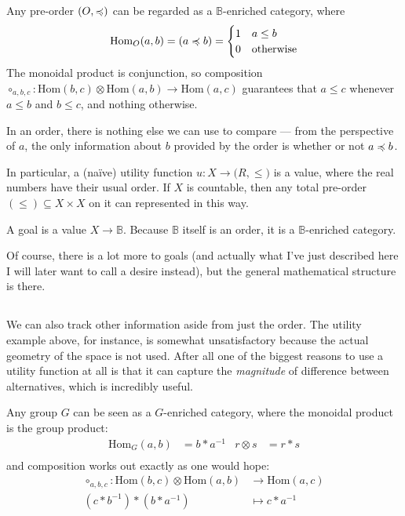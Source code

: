 \documentclass{article}
\begin{document}
	\begin{example}
		Any pre-order $(O, \preccurlyeq)$ can be regarded as a $\mathbb B$-enriched category, where 
		\[  \mathrm{Hom}_O(a,b)= (a \preccurlyeq b)  = \begin{cases}
			1 & a \leq b \\ 0 &\text{otherwise}
		\end{cases} \]
		The monoidal product is conjunction, so composition
		$ \circ_{a,b,c}: \mathrm{Hom}(b,c) \otimes \mathrm{Hom}(a,b) \to \mathrm{Hom}(a,c)$
		guarantees that $a \leq c$ whenever $a \leq b$ and $b\leq c$, and nothing otherwise.
		
		In an order, there is nothing else we can use to compare --- from the perspective of $a$, the only information about $b$ provided by the order is whether or not $a \preccurlyeq b$.
	\end{example}


	
	\begin{example}
		In particular, a (na\"ive) utility function $u: X \to \mathbb (R, \leq)$ is a value, where the real numbers have their usual order. If $X$ is countable, then any total pre-order $(\leq) \subseteq X \times X$ on it can represented in this way.
	\end{example}

	\begin{example}
		A goal is a value $X \to \mathbb B$. Because $\mathbb B$ itself is an order, it is a $\mathbb B$-enriched category. 
	\end{example}

	Of course, there is a lot more to goals (and actually what I've just described here I will later want to call a desire instead), but the general mathematical structure is there.

	
	\subsection{}
	We can also track other information aside from just the order. The utility example above, for instance, is somewhat unsatisfactory because the actual geometry of the space is not used. After all one of the biggest reasons to use a utility function at all is that it can capture the \textit{magnitude} of difference between alternatives, which is incredibly useful.
	
	
	\begin{fact}
		Any group $G$ can be seen as a $G$-enriched category, where the monoidal product is the group product:
		\begin{align*}
			\mathrm{Hom}_{G}(a, b) &= b * a^{-1} &
			r \otimes s &= r * s \\
		\end{align*}
		and composition works out exactly as one would hope:
		\begin{align*}
		\circ_{a,b,c} : \mathrm{Hom}(b,c) \otimes \mathrm{Hom}(a,b) &\to \mathrm{Hom}(a,c)\\
		(c * b^{-1}) * (b * a^{-1}) &\mapsto c * a^{-1}
		\end{align*}
	\end{fact}
	
\end{document}
